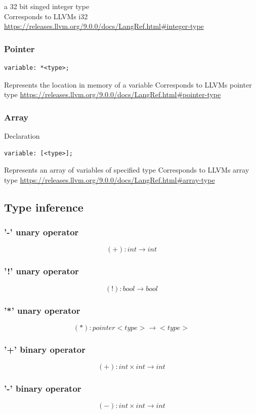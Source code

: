 \documentclass{article}
\begin{document}
a 32 bit singed integer type \\
Corresponds to LLVMs i32 \url{https://releases.llvm.org/9.0.0/docs/LangRef.html#integer-type}
\subsubsection{Pointer}
\begin{verbatim}
variable: *<type>;
\end{verbatim}
Represents the location in memory of a variable
Corresponds to LLVMs pointer type \url{https://releases.llvm.org/9.0.0/docs/LangRef.html#pointer-type}
\subsubsection{Array}
Declaration 
\begin{verbatim}
variable: [<type>];
\end{verbatim}
Represents an array of variables of specified type
Corresponds to LLVMs array type \url{https://releases.llvm.org/9.0.0/docs/LangRef.html#array-type}

\subsection{Type inference}


\subsubsection{'-' unary operator}
$$
(+): int \longrightarrow int
$$

\subsubsection{'!' unary operator}
$$
(!): bool \longrightarrow bool
$$

\subsubsection{'*' unary operator}
$$
(*): pointer <type> \longrightarrow <type> 
$$

\subsubsection{'+' binary operator}
$$
(+): int \times int \longrightarrow int
$$

\subsubsection{'-' binary operator}
$$
(-): int \times int \longrightarrow int
$$
\end{document}
